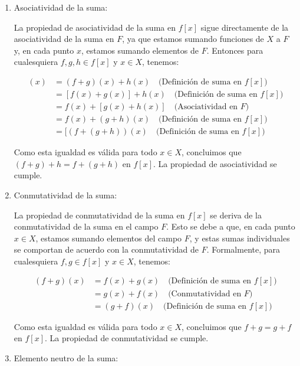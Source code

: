 \begin{enumerate}
    \item Asociatividad de la suma: 
    
    La propiedad de asociatividad de la suma en $f[x]$ sigue directamente de la asociatividad de la suma en $F$, ya que estamos sumando funciones de $X$ a $F$ y, en cada punto $x$, estamos sumando elementos de $F$. Entonces para cualesquiera $f, g, h \in f[x]$ y $x \in X$, tenemos:
    
    \begin{align*}
        [(f + g) + h](x) &= (f + g)(x) + h(x) \quad \text{(Definición de suma en } f[x]\text{)} \\
        &= [f(x) + g(x)] + h(x) \quad \text{(Definición de suma en } f[x]\text{)} \\
        &= f(x) + [g(x) + h(x)] \quad \text{(Asociatividad en } F\text{)} \\
        &= f(x) + (g + h)(x) \quad \text{(Definición de suma en } f[x]\text{)} \\
        &= [(f + (g + h))(x) \quad \text{(Definición de suma en } f[x]\text{)}
    \end{align*}
    
    Como esta igualdad es válida para todo $x \in X$, concluimos que $(f + g) + h = f + (g + h)$ en $f[x]$. La propiedad de asociatividad se cumple.

    \item Conmutatividad de la suma: 
    
    La propiedad de conmutatividad de la suma en $f[x]$ se deriva de la conmutatividad de la suma en el campo $F$. Esto se debe a que, en cada punto $x \in X$, estamos sumando elementos del campo $F$, y estas sumas individuales se comportan de acuerdo con la conmutatividad de $F$. Formalmente, para cualesquiera $f, g \in f[x]$ y $x \in X$, tenemos:
    
    \begin{align*}
        (f + g)(x) &= f(x) + g(x) \quad \text{(Definición de suma en } f[x]\text{)} \\
        &= g(x) + f(x) \quad \text{(Conmutatividad en } F\text{)} \\
        &= (g + f)(x) \quad \text{(Definición de suma en } f[x]\text{)}
    \end{align*}
    
    Como esta igualdad es válida para todo $x \in X$, concluimos que $f + g = g + f$ en $f[x]$. La propiedad de conmutatividad se cumple.

    \item Elemento neutro de la suma: 
    

\end{enumerate}
